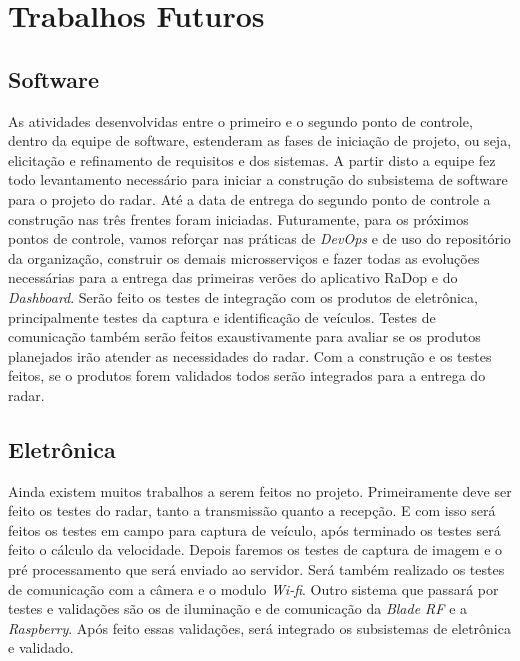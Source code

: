 \chapter{Trabalhos Futuros} %
\label{cha:trabalhos-futuros}

\section{Software}

As atividades desenvolvidas entre o primeiro e o segundo ponto de controle, dentro da equipe de software, estenderam as fases de iniciação de projeto, ou seja, elicitação e refinamento de requisitos e dos sistemas. A partir disto a equipe fez todo levantamento necessário para iniciar a construção do subsistema de software para o projeto do radar. Até a data de entrega do segundo ponto de controle a construção nas três frentes foram iniciadas. Futuramente, para os próximos pontos de controle, vamos reforçar nas práticas de \textit{DevOps} e de uso do repositório da organização, construir os demais microsserviços e fazer todas as evoluções necessárias para a entrega das primeiras verões do aplicativo RaDop e do \textit{Dashboard}. Serão feito os testes de integração com os produtos de eletrônica, principalmente testes da captura e identificação de veículos. Testes de comunicação também serão feitos exaustivamente para avaliar se os produtos planejados irão atender as necessidades do radar. Com a construção e os testes feitos, se o produtos forem validados todos serão integrados para a entrega do radar.

\section{Eletrônica}

Ainda existem muitos trabalhos a serem feitos no projeto. Primeiramente deve ser feito os testes do radar, tanto a transmissão quanto a recepção. E com isso será feitos os testes em campo para captura de veículo, após terminado os testes será feito o cálculo da velocidade. Depois faremos os testes de captura de imagem e o pré processamento que será enviado ao servidor. Será também realizado os testes de comunicação com a câmera e o modulo \emph{Wi-fi}. Outro sistema que passará por testes e validações são os de iluminação e de comunicação da \emph{Blade RF} e a \emph{Raspberry}. Após feito essas validações, será integrado os subsistemas de eletrônica e validado.

